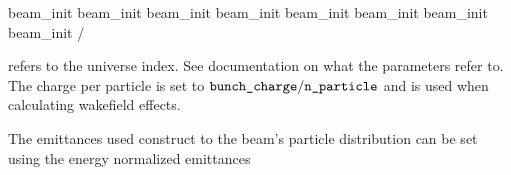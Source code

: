 {{{{{{{{{{{{{{{{\begin{example}
    beam_init%
    beam_init%
    beam_init%
    beam_init%
    beam_init%
    beam_init%
    beam_init%
    beam_init%
  /
\end{example}
 refers to the universe index. See \bmad documentation on what
the  parameters refer to. The charge per particle is set to
$\vn{bunch_charge} / \vn{n_particle}$ and is used when calculating wakefield
effects.

The emittances used construct to the beam's particle distribution can
be set using the energy normalized emittances \vn{%
\vn{%
\vn{%
are used. These emittances are also used as the initial emittance in a
linear lattice for the emittance calculation using the radiation
integrals.

}}}}}}}}}}}}}}}}}}}
